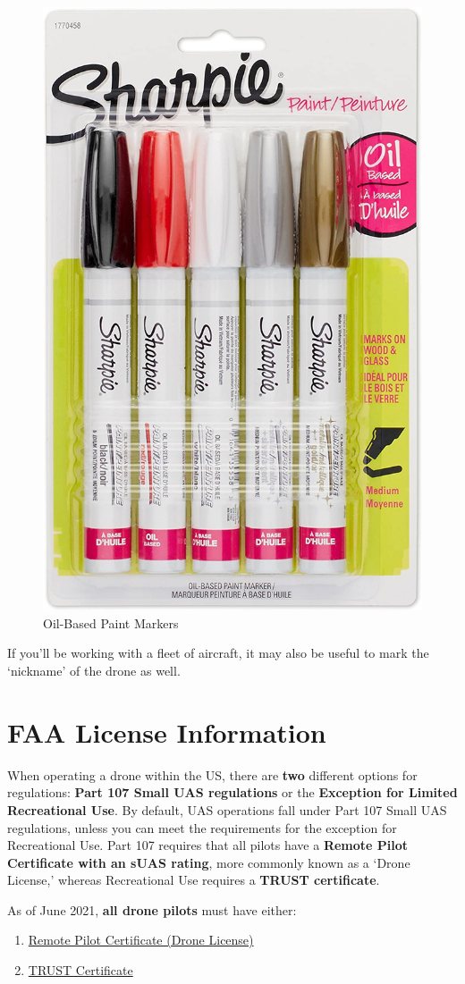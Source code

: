 \documentclass[
  12pt,
]{book}
\providecommand{\tightlist}{%
  \setlength{\itemsep}{0pt}\setlength{\parskip}{0pt}}
\begin{document}
\begin{figure}

{\centering \includegraphics[width=0.5\linewidth]{images/oil-based-markers} 

}

\caption{Oil-Based Paint Markers}\label{fig:markers}
\end{figure}

If you'll be working with a fleet of aircraft, it may also be useful to mark the `nickname' of the drone as well.

\hypertarget{license}{%
\chapter{FAA License Information}\label{license}}

When operating a drone within the US, there are \textbf{two} different options for regulations: \textbf{Part 107 Small UAS regulations} or the \textbf{Exception for Limited Recreational Use}. By default, UAS operations fall under Part 107 Small UAS regulations, unless you can meet the requirements for the exception for Recreational Use. Part 107 requires that all pilots have a \textbf{Remote Pilot Certificate with an sUAS rating}, more commonly known as a `Drone License,' whereas Recreational Use requires a \textbf{TRUST certificate}.

As of June 2021, \textbf{all drone pilots} must have either:

\begin{enumerate}
\def\labelenumi{\arabic{enumi}.}
\tightlist
\item
  \protect\hyperlink{get-license}{Remote Pilot Certificate (Drone License)}
\item
  \protect\hyperlink{TRUST}{TRUST Certificate}
\end{enumerate}
\end{document}
